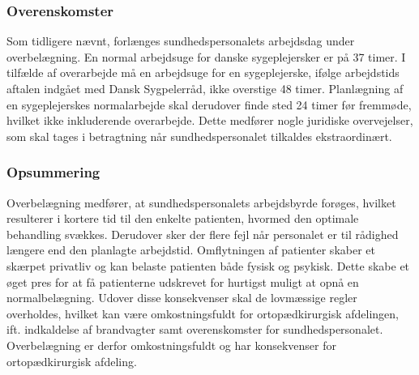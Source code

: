 \subsubsection{Overenskomster}
Som tidligere nævnt, forlænges sundhedspersonalets arbejdsdag under overbelægning. En normal arbejdsuge for danske sygeplejersker er på 37 timer. I tilfælde af overarbejde må en arbejdsuge for en sygeplejerske, ifølge arbejdstids aftalen indgået med Dansk Sygpelerråd, ikke overstige 48 timer. Planlægning af en sygeplejerskes normalarbejde skal derudover finde sted 24 timer før fremmøde, hvilket ikke inkluderende overarbejde. \cite{Danske2015}  Dette medfører nogle juridiske overvejelser, som skal tages i betragtning når sundhedspersonalet tilkaldes ekstraordinært. 


\subsubsection{Opsummering}
Overbelægning medfører, at sundhedspersonalets arbejdsbyrde forøges, hvilket resulterer i kortere tid til den enkelte patienten, hvormed den optimale behandling svækkes. \cite{Dinges2004} \cite{Aiken2002} Derudover sker der flere fejl når personalet er til rådighed længere end den planlagte arbejdstid.\cite{Dinges2004} Omflytningen af patienter skaber et skærpet privatliv og kan belaste patienten både fysisk og psykisk. \cite{Madsen2014} \cite{Heidmann2014} Dette skabe et øget pres for at få patienterne udskrevet for hurtigst muligt at opnå en normalbelægning. Udover disse konsekvenser skal de lovmæssige regler overholdes, hvilket kan være omkostningsfuldt for ortopædkirurgisk afdelingen, ift. indkaldelse af brandvagter samt overenskomster for sundhedspersonalet. \cite{Beredskab2016}\cite{Danske2015} Overbelægning er derfor omkostningsfuldt og har konsekvenser for ortopædkirurgisk afdeling.
